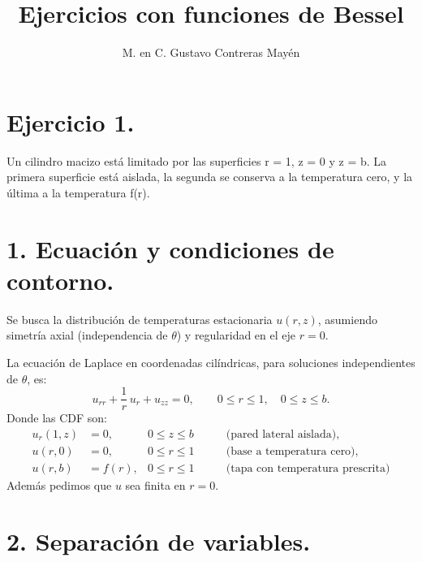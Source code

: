 \documentclass[12pt]{article}
\title{Ejercicios con funciones de Bessel}
\author{M. en C. Gustavo Contreras Mayén}
\date{}
\begin{document}
\maketitle
\fontsize{14}{14}\selectfont

\section*{Ejercicio 1.}

Un cilindro macizo está limitado por las superficies r = 1, z = 0 y z = b. La primera superficie está aislada, la segunda se conserva a la temperatura cero, y la última a la temperatura f(r).

\section*{1. Ecuación y condiciones de contorno.}
Se busca la distribución de temperaturas estacionaria $u (r, z)$, asumiendo simetría axial (independencia de $\theta$) y regularidad en el eje $r = 0$.
\par
La ecuación de Laplace en coordenadas cilíndricas, para soluciones independientes de $\theta$, es:
\begin{equation}\label{laplace}
u_{rr} + \dfrac{1}{r} \, u_{r} + u_{zz} = 0, \qquad 0 \le r \le 1, \quad 0 \le z\le b.
\end{equation}
Donde las CDF son:
\begin{align}
u_{r} (1, z) &= 0, &0 \le z \le b \qquad &\text{(pared lateral aislada)},\label{bc_r} \\[1em]
u (r, 0) &= 0, &0 \le r \le 1 \qquad &\text{(base a temperatura cero)}, \label{bc_z0} \\[1em]
u (r, b) &= f (r), &0 \le r\le 1 \qquad &\text{(tapa con temperatura prescrita)}\label{bc_zb}
\end{align}
Además pedimos que $u$ sea finita en $r = 0$.

\section*{2. Separación de variables.}
\end{document}
